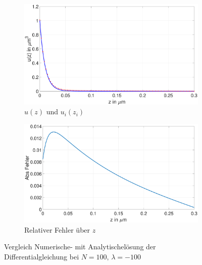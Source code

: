  \begin{figure}[h]
 	\begin{subfigure}[b]{0.5\textwidth}
 		\includegraphics[width=\textwidth]{figures/station_gl_2_1/test_n100_l100}
 		\caption{$u(z)$ und $u_{i}(z_i)$}
 	\end{subfigure}
 	\hfill
 	\begin{subfigure}[b]{0.5\textwidth}
 		\includegraphics[width=1\linewidth]{figures/station_gl_2_1/test_n100_l100_fehler}
 		\caption{Relativer Fehler über $z$}
 	\end{subfigure}
 	\caption{Vergleich Numerische- mit Analytischelösung der Differentialgleichung bei $N=100,\,\lambda=-100$}
 \end{figure}
